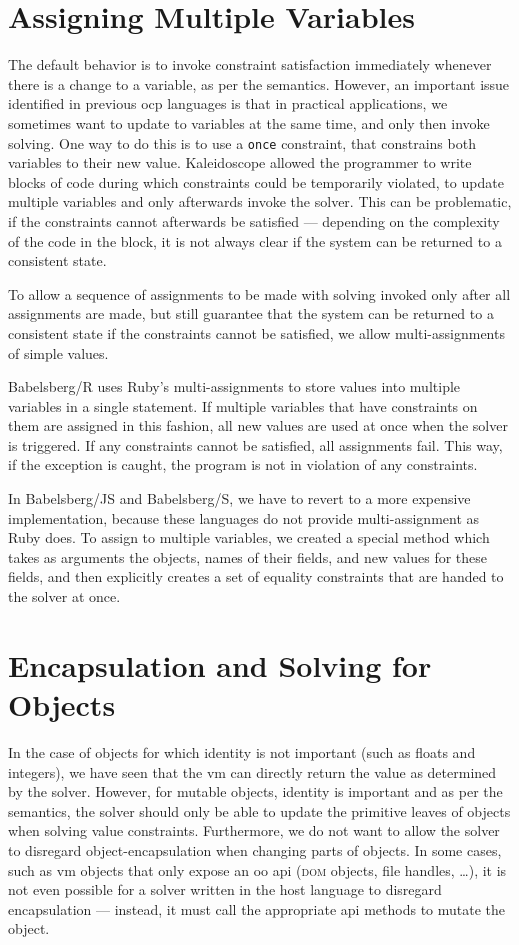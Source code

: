 \section{Assigning Multiple Variables}
\label{sec:assign-mult-vari}
The default behavior is to invoke constraint satisfaction immediately whenever
there is a change to a variable, as per the semantics. However, an important
issue identified in previous \ac{ocp} languages is that in practical
applications, we sometimes want to update to variables at the same time, and
only then invoke solving. One way to do this is to use a \lstinline{once}
constraint, that constrains both variables to their new value. Kaleidoscope
allowed the programmer to write blocks of code during which constraints could be
temporarily violated, to update multiple variables and only afterwards invoke
the solver. This can be problematic, if the constraints cannot afterwards be
satisfied --- depending on the complexity of the code in the block, it is not
always clear if the system can be returned to a consistent state.

To allow a sequence of assignments to be made with solving invoked only after
all assignments are made, but still guarantee that the system can be returned to
a consistent state if the constraints cannot be satisfied, we allow
multi-assignments of simple values.

Babelsberg/R uses Ruby's multi-assignments to store values into multiple
variables in a single statement. If multiple variables that have constraints on
them are assigned in this fashion, all new values are used at once when the
solver is triggered. If any constraints cannot be satisfied, all assignments
fail. This way, if the exception is caught, the program is not in violation of
any constraints.

In Babelsberg/JS and Babelsberg/S, we have to revert to a more expensive
implementation, because these languages do not provide multi-assignment as Ruby
does. To assign to multiple variables, we created a special method which takes
as arguments the objects, names of their fields, and new values for these
fields, and then explicitly creates a set of equality constraints that are
handed to the solver at once.

\section{Encapsulation and Solving for Objects}
\label{sec:solv-mutable-objects}
In the case of objects for which identity is not important (such as floats and
integers), we have seen that the \ac{vm} can directly return the value as
determined by the solver. However, for mutable objects, identity is important
and as per the semantics, the solver should only be able to update the primitive
leaves of objects when solving value constraints. Furthermore, we do not want to
allow the solver to disregard object-encapsulation when changing parts of
objects. In some cases, such as \ac{vm} objects that only expose an \ac{oo}
\ac{api} (\textsc{dom} objects, file handles, \dots), it is not even possible
for a solver written in the host language to disregard encapsulation --- instead,
it must call the appropriate \ac{api} methods to mutate the object.

